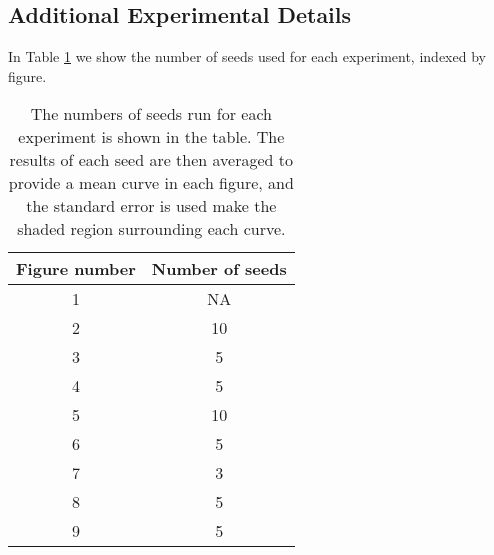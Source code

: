 \documentclass{article} \usepackage[dvipsnames]{xcolor}
\begin{document}
\subsection{Additional Experimental Details}
\label{sec:additional_details}
In Table \ref{table:seeds} we show the number of seeds used for each experiment, indexed by figure.

\begin{table}[!ht]
\centering
\begin{tabular}{c | c} 
 Figure number & Number of seeds  \\ [0.5ex] 
 \hline
 1 & NA  \\
 2 & 10  \\
 3 & 5  \\
 4 & 5  \\
 5 & 10  \\
 6 & 5  \\
 7 & 3  \\
 8 & 5  \\
 9 & 5  \\
\end{tabular}
\caption{The numbers of seeds run for each experiment is shown in the table. The results of each seed are then averaged to provide a mean curve in each figure, and the standard error is used make the shaded region surrounding each curve.}
\label{table:seeds}
\end{table}
\end{document}
